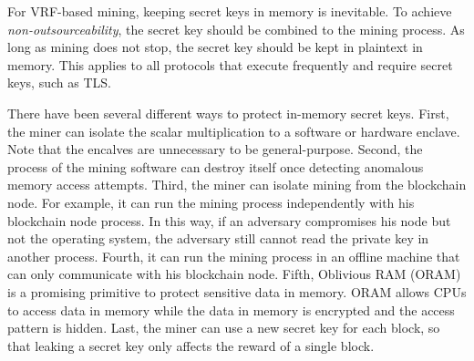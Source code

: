 For VRF-based mining, keeping secret keys in memory is inevitable.
To achieve \emph{non-outsourceability}, the secret key should be combined to the mining process.
As long as mining does not stop, the secret key should be kept in plaintext in memory.
This applies to all protocols that execute frequently and require secret keys, such as TLS.

There have been several different ways to protect in-memory secret keys.
First, the miner can isolate the scalar multiplication to a software or hardware enclave.
Note that the encalves are unnecessary to be general-purpose.
Second, the process of the mining software can destroy itself once detecting anomalous memory access attempts.
Third, the miner can isolate mining from the blockchain node.
For example, it can run the mining process independently with his blockchain node process.
In this way, if an adversary compromises his node but not the operating system, the adversary still cannot read the private key in another process.
Fourth, it can run the mining process in an offline machine that can only communicate with his blockchain node.
Fifth, Oblivious RAM (ORAM) is a promising primitive to protect sensitive data in memory.
ORAM allows CPUs to access data in memory while the data in memory is encrypted and the access pattern is hidden.
Last, the miner can use a new secret key for each block, so that leaking a secret key only affects the reward of a single block.
